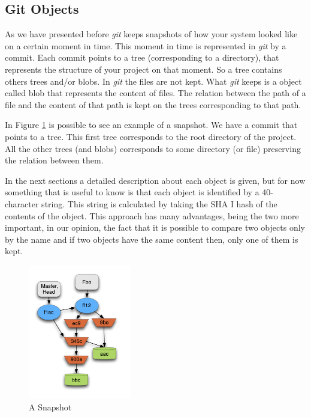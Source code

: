 \subsection{Git Objects}
As we have presented before \emph{git} keeps snapshots of how your system
looked like on a certain moment in time. This moment in time is
represented in \emph{git} by a commit. Each commit points to a tree
(corresponding to a directory), that
represents the structure of your project on that moment. So a tree
contains others trees and/or blobs. In \emph{git} the files are not kept. 
What \emph{git} keeps is a object called blob that represents the content of files. The
relation between the path of a file and the content of that path 
is kept on the trees corresponding to that path. \par
In Figure \ref{fig:snapshot} is possible to see an example of a snapshot. We
have a commit that points to a tree. This first tree corresponds to
the root directory of the project. All the other trees (and blobs)
corresponds to some directory (or file) preserving the relation
between them. \par
In the next sections a detailed description about each object is
given, but for now something that is useful to know is that each
object is identified by a 40-character string. This string is
calculated by taking the SHA I hash of the contents of the object.
This approach has many advantages, being the two more important, in our
opinion, the
fact that it is possible to compare two objects only by the name and
if two objects have the same content then, only one of them is kept.\par

\begin{figure}[!h]
   \centering
   \includegraphics[width=0.4\textwidth]{images/object_assoc.png}
   \caption{A Snapshot}
   \label{fig:snapshot}
\end{figure}

